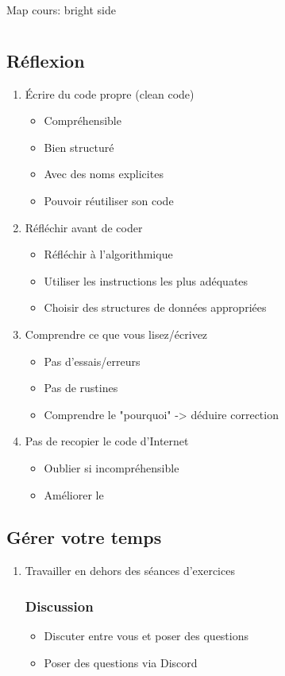 Map cours: bright side
\chapter{}
\section{Réflexion}
\begin{enumerate}
  \item Écrire du code propre (clean code)
  \begin{itemize}
    \item Compréhensible
    \item Bien structuré
    \item Avec des noms explicites
    \item Pouvoir réutiliser son code
  \end{itemize}
  \item Réfléchir avant de coder
  \begin{itemize}
    \item Réfléchir à l'algorithmique
    \item Utiliser les instructions les plus adéquates
    \item Choisir des structures de données appropriées
  \end{itemize}
  \item Comprendre ce que vous lisez/écrivez
  \begin{itemize}
    \item Pas d'essais/erreurs
    \item Pas de rustines
    \item Comprendre le "pourquoi" -> déduire correction
  \end{itemize}
  \item Pas de recopier le code d'Internet
  \begin{itemize}
    \item Oublier si incompréhensible
    \item Améliorer le
  \end{itemize}
\end{enumerate}
\section{Gérer votre temps}
\begin{enumerate}
  \item Travailler en dehors des séances d'exercices
  \subsection{Discussion}
  \begin{itemize}
    \item Discuter entre vous et poser des questions
    \item Poser des questions via Discord
  \end{itemize}
\end{enumerate}
